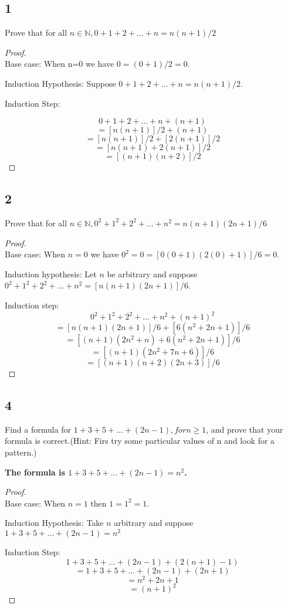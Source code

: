 \documentclass{article}
\begin{document}
\subsection{1}
Prove that for all $n \in \mathbb{N}, 0+1+2+ \dots +n=n(n+1)/2$

\begin{proof}$ $\\
    Base case: When n=0 we have $0=(0+1)/2=0$.

    Induction Hypothesis: Suppose $0+1+2+\dots+n=n(n+1)/2$.

    
    Induction Step:

    $$0+1+2+\dots+n+(n+1)$$
    $$=[n(n+1)]/2+(n+1)$$
    $$=[n(n+1)]/2 + [2(n+1)]/2$$
    $$=[n(n+1)+2(n+1)]/2$$
    $$=[(n+1)(n+2)]/2$$
\end{proof}
\newpage
\subsection{2}
Prove that for all $n\in \mathbb{N},0^2+1^2+2^2+\dots+n^2=n(n+1)(2n+1)/6$

\begin{proof}$ $\\
Base case: When $n=0$ we have $0^2=0=[0(0+1)(2(0)+1)]/6=0$.

Induction hypothesis: Let $n$ be arbitrary and suppose $0^2+1^2+2^2+\dots+n^2=[n(n+1)(2n+1)]/6$.

Induction step: 
$$0^2+1^2+2^2+ \dots + n^2 +(n+1)^2$$
$$=[n(n+1)(2n+1)]/6+[6(n^2+2n+1)]/6$$
$$=[(n+1)(2n^2+n)+6(n^2+2n+1)]/6$$
$$=[(n+1)(2n^2+7n+6)]/6$$
$$=[(n+1)(n+2)(2n+3)]/6$$


    
\end{proof}
\subsection{4}
Find a formula for $1+3+5+\dots+(2n-1), for n \geq 1$, and prove that your formula is correct.(Hint: Firs try some particular values of n and look for a pattern.)




\textbf{The formula is $1+3+5+\dots+(2n-1)=n^2$.}
\begin{proof}$ $\\
    Base case: When $n=1$ then $1=1^2=1$.

    Induction Hypothesis: Take $n$ arbitrary and suppose $1+3+5+\dots+(2n-1)=n^2$

    Induction Step:
    $$1+3+5+\dots+(2n-1)+(2(n+1)-1)$$
    $$=1+3+5+\dots+(2n-1)+(2n+1)$$
    $$=n^2+2n+1$$
    $$=(n+1)^2$$
\end{proof}
\end{document}
